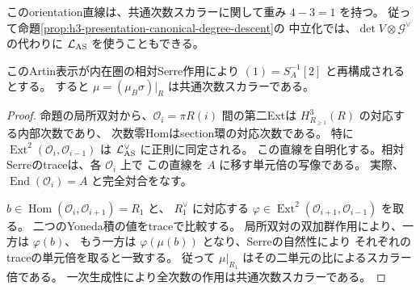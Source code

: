 このorientation直線は、共通次数スカラーに関して重み $4-3=1$ を持つ。
従って命題\ref{prop:h3-presentation-canonical-degree-descent}の
中立化では、$\det V\otimes\mathcal G^\vee$ の代わりに
$\mathcal L_{\rm AS}$ を使うこともできる。

\begin{corollary}\label{cor:h3-artin-relative-nakayama-scalar}
このArtin表示が内在圏の相対Serre作用により
$(1)=S_A^{-1}[2]$ と再構成されるとする。
すると $\mu=(\mu_B\sigma)|_R$ は共通次数スカラーである。
\end{corollary}
\begin{proof}
命題の局所双対から、$\mathcal O_i=\pi R(i)$ 間の第二Extは
$H^3_{R_{\ge1}}(R)$ の対応する内部次数であり、
次数零Homはsection環の対応次数である。
特に $\operatorname{Ext}^2(\mathcal O_i,\mathcal O_{i-1})$
は $\mathcal L_{\rm AS}^\vee$ に正則に同定される。
この直線を自明化する。相対Serreのtraceは、各 $\mathcal O_i$ 上で
この直線を $A$ に移す単元倍の写像である。
実際、$\operatorname{End}(\mathcal O_i)=A$ と完全対合をなす。

$b\in\operatorname{Hom}(\mathcal O_i,\mathcal O_{i+1})=R_1$ と、
$R_1^\vee$ に対応する
$\varphi\in\operatorname{Ext}^2(\mathcal O_{i+1},\mathcal O_{i-1})$ を取る。
二つのYoneda積の値をtraceで比較する。
局所双対の双加群作用により、一方は $\varphi(b)$、
もう一方は $\varphi(\mu(b))$ となり、Serreの自然性により
それぞれのtraceの単元倍を取ると一致する。
従って $\mu|_{R_1}$ はその二単元の比によるスカラー倍である。
一次生成性により全次数の作用は共通次数スカラーである。
\end{proof}

